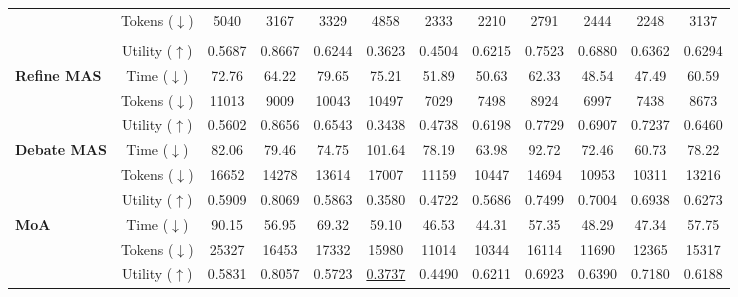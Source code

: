\begin{table}[!t]
{\begin{tabular}{l|c|ccc|ccc|ccc|c}
        \cellcolor{orange!7}
        & Tokens ($\downarrow$) & 5040 & 3167 & 3329 & 4858 & 2333 & 2210 & 2791 & 2444 & 2248 & 3137\\
        \addlinespace[-0.4ex] \midrule \addlinespace[-0.000ex]
        \rowcolor{gray!16}
        \multicolumn{12}{c}{
            \rule{0pt}{1.1em}
            \textbf{\textit{Multi-Agent Setting}}
            \rule[-0.3em]{0pt}{1.1em}
        } \\
        [-0.4ex]\midrule\addlinespace[-0.000ex]
        \cellcolor{yellow!7}
        & Utility ($\uparrow$)   & 0.5687 & 0.8667 & 0.6244 & 0.3623 & 0.4504 & 0.6215 & 0.7523 & 0.6880 & 0.6362 & 0.6294\\
        \cellcolor{yellow!7}\textbf{Refine MAS \citeyearpar{DBLP:conf/nips/MadaanTGHGW0DPY23}}
        & Time ($\downarrow$)  & 72.76 & 64.22 & 79.65 & 75.21 & 51.89 & 50.63 & 62.33 & 48.54 & 47.49 & 60.59\\
        \cellcolor{yellow!7}
        & Tokens ($\downarrow$) & 11013 & 9009 & 10043 & 10497 & 7029 & 7498 & 8924 & 6997 & 7438 & 8673\\
        [-0.4ex]\midrule\addlinespace[-0.000ex]
        \cellcolor{green!7}
        & Utility ($\uparrow$)   & 0.5602 & 0.8656 & 0.6543 & 0.3438 & 0.4738 & 0.6198 & 0.7729 & 0.6907 & 0.7237 & 0.6460\\
        \cellcolor{green!7}\textbf{Debate MAS \citeyearpar{DBLP:conf/icml/Du00TM24}}
        & Time ($\downarrow$)  & 82.06 & 79.46 & 74.75 & 101.64 & 78.19 & 63.98 & 92.72 & 72.46 & 60.73 & 78.22\\
        \cellcolor{green!7}
        & Tokens ($\downarrow$) & 16652 & 14278 & 13614 & 17007 & 11159 & 10447 & 14694 & 10953 & 10311 & 13216\\
        [-0.4ex]\midrule\addlinespace[-0.000ex]
        \cellcolor{teal!7}
        & Utility ($\uparrow$)   & 0.5909 & 0.8069 & 0.5863 & 0.3580 & 0.4722 & 0.5686 & 0.7499 & 0.7004 & 0.6938 & 0.6273\\
        \cellcolor{teal!7}\textbf{MoA \citeyearpar{DBLP:conf/iclr/WangWAZZ25}}
        & Time ($\downarrow$)  & 90.15 & 56.95 & 69.32 & 59.10 & 46.53 & 44.31 & 57.35 & 48.29 & 47.34 & 57.75\\
        \cellcolor{teal!7}
        & Tokens ($\downarrow$) & 25327 & 16453 & 17332 & 15980 & 11014 & 10344 & 16114 & 11690 & 12365 & 15317\\
        [-0.4ex]\midrule\addlinespace[-0.000ex]
        \cellcolor{blue!7}
        & Utility ($\uparrow$)   & 0.5831 & 0.8057 & 0.5723 & \underline{0.3737} & 0.4490 & 0.6211 & 0.6923 & 0.6390 & 0.7180 & 0.6188\\

\end{tabular}}
\end{table}
